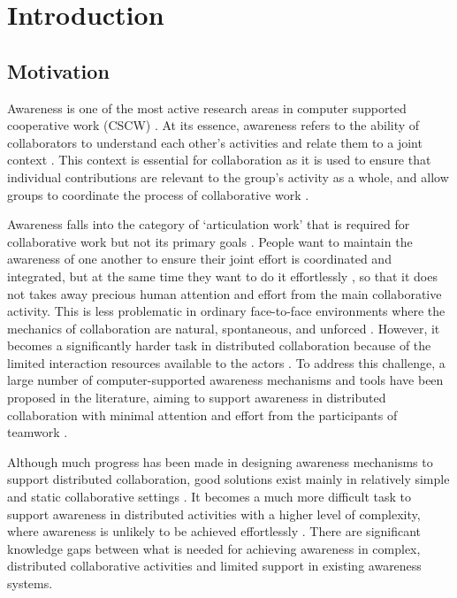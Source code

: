 \graphicspath{{Figures/}}

\chapter{Introduction} 
\label{chapter1:introduction}

\section{Motivation} %
\label{sec:motivation}
Awareness is one of the most active research areas in computer supported cooperative work (CSCW) \cite{dourish1992awareness,schmidt2002a,rittenbruch2009a}. At its essence, awareness refers to the ability of collaborators to understand each other's activities and relate them to a joint context \cite{rittenbruch2009a}. This context is essential for collaboration as it is used to ensure that individual contributions are relevant to the group's activity as a whole, and allow groups to coordinate the process of collaborative work \cite{dourish1992awareness}. 

Awareness falls into the category of `articulation work' that is required for collaborative work but not its primary goals \cite{schmidt1992taking}. People want to maintain the awareness of one another to ensure their joint effort is coordinated and integrated, but at the same time they want to do it effortlessly \cite{fussell1998coordination}, so that it does not takes away precious human attention and effort from the main collaborative activity. This is less problematic in ordinary face-to-face environments where the mechanics of collaboration are natural, spontaneous, and unforced \cite{Gutwin2002}. However, it becomes a significantly harder task in distributed collaboration because of the limited interaction resources available to the actors \cite{carroll2003a}. To address this challenge, a large number of computer-supported awareness mechanisms and tools have been proposed in the literature, aiming to support awareness in distributed collaboration with minimal attention and effort from the participants of teamwork \cite{rittenbruch2009a,markopoulos2009design}.

Although much progress has been made in designing awareness mechanisms to support distributed collaboration, good solutions exist mainly in relatively simple and static collaborative settings \cite{antunes2010a}. It becomes a much more difficult task to support awareness in distributed activities with a higher level of complexity, where awareness is unlikely to be achieved effortlessly \cite{cabitza2009promoting}. There are significant knowledge gaps between what is needed for achieving awareness in complex, distributed collaborative activities and limited support in existing awareness systems.

